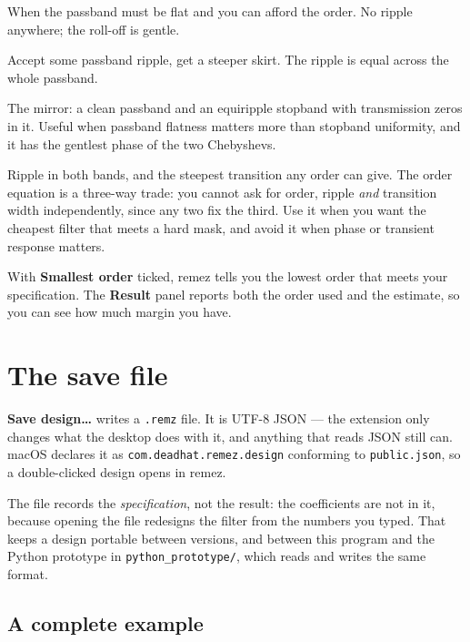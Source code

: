 \documentclass[11pt,a4paper]{article}
\newcommand{\ctl}[1]{\textbf{#1}}
\newcommand{\lit}[1]{\texttt{#1}}
\begin{document}
\begin{description}[leftmargin=*,style=nextline]
  \item[Butterworth] When the passband must be flat and you can afford the
    order. No ripple anywhere; the roll-off is gentle.
  \item[Chebyshev I] Accept some passband ripple, get a steeper skirt. The
    ripple is equal across the whole passband.
  \item[Chebyshev II] The mirror: a clean passband and an equiripple stopband
    with transmission zeros in it. Useful when passband flatness matters more
    than stopband uniformity, and it has the gentlest phase of the two
    Chebyshevs.
  \item[Elliptic (Cauer)] Ripple in both bands, and the steepest transition any
    order can give. The order equation is a three-way trade: you cannot ask for
    order, ripple \emph{and} transition width independently, since any two fix
    the third. Use it when you want the cheapest filter that meets a hard mask,
    and avoid it when phase or transient response matters.
\end{description}

With \ctl{Smallest order} ticked, remez tells you the lowest order that meets
your specification. The \ctl{Result} panel reports both the order used and the
estimate, so you can see how much margin you have.

\clearpage
\section{The save file}
\label{sec:savefile}

\ctl{Save design\dots} writes a \lit{.remz} file. It is UTF-8 JSON --- the
extension only changes what the desktop does with it, and anything that reads
JSON still can. macOS declares it as \lit{com.deadhat.remez.design} conforming
to \lit{public.json}, so a double-clicked design opens in remez.

The file records the \emph{specification}, not the result: the coefficients are
not in it, because opening the file redesigns the filter from the numbers you
typed. That keeps a design portable between versions, and between this program
and the Python prototype in \lit{python\_prototype/}, which reads and writes the
same format.

\subsection{A complete example}
\end{document}
